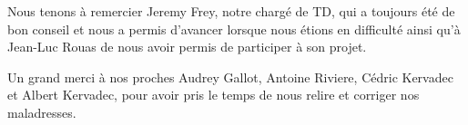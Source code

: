 \begin{thanks_perso}
Nous tenons à remercier Jeremy Frey, notre chargé de TD, qui a toujours été de bon conseil et nous a permis d’avancer lorsque nous étions en difficulté ainsi qu'à Jean-Luc Rouas de nous avoir permis de participer à son projet.

Un grand merci à nos proches Audrey Gallot, Antoine Riviere, Cédric Kervadec et Albert Kervadec, pour avoir pris le temps de nous relire et corriger nos maladresses.
\end{thanks_perso}